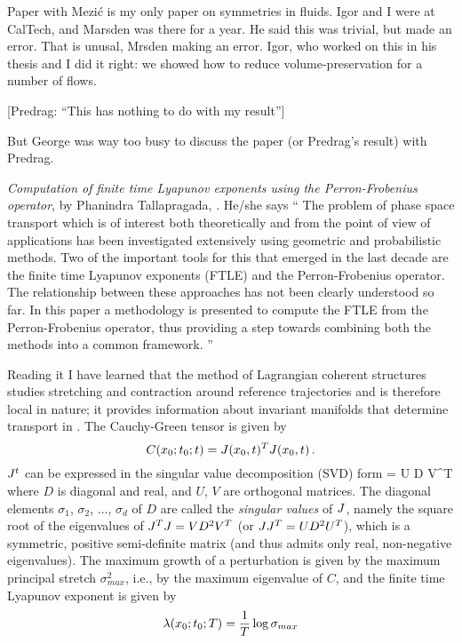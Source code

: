 \begin{description}

Paper with Mezi\'c is my only paper on symmetries in fluids.
Igor and I were at CalTech, and Marsden was there for a year. He said
this was trivial, but made an error. That is unusal, Mrsden making an
error. Igor, who worked on this in his thesis and I did it right: we
showed how to reduce volume-preservation for a number of flows.

[Predrag: ``This has nothing to do with my result'']

But George was way too busy to discuss the paper (or Predrag's result)
with Predrag.

\item[2011-07-16 Predrag]
{\em Computation of finite time {Lyapunov} exponents using the
{Perron-Frobenius} operator}, by Phanindra Tallapragada,
. He/she says
``
    The problem of phase space transport which is of interest both
    theoretically and from the point of view of applications has been
    investigated extensively using geometric and probabilistic methods.
    Two of the important tools for this that emerged in the last decade
    are the finite time Lyapunov exponents (FTLE) and the
    Perron-Frobenius operator. The relationship between these approaches
    has not been clearly understood so far. In this paper a methodology
    is presented to compute the FTLE from the Perron-Frobenius operator,
    thus providing a step towards combining both the methods into a
    common framework.
''

                                                    \toCB
Reading it I have learned that the method of Lagrangian coherent
structures studies stretching and contraction around reference
trajectories and is therefore local in nature; it provides information
about invariant manifolds that determine transport in \statesp. The
Cauchy-Green tensor is given by
\[
C({x_0}; t_0; t) = J({x_0},t)^T J({x_0},t)
\,.
\]
$J^t$ can be expressed in the singular value decomposition (SVD) form
\beq
\jMps = {U} {D}  {V}^T
where ${D}$ is diagonal and real, and ${U}$, ${V}$ are orthogonal
matrices. The diagonal elements
$\sigma_{1}$, $\sigma_{2}$, $\dots$, $\sigma_{d}$ of ${D}$ are called the
\emph{singular values} of $\jMps$, namely the square root of the
eigenvalues of $\jMps^{T}\jMps = {V}{D}^{2}{V}^T$ (or $\jMps\jMps^{T} =
{U}{D}^{2}{U}^T$), which is a symmetric, positive semi-definite matrix
(and thus admits only real, non-negative eigenvalues).
The maximum growth of a
perturbation is given by the maximum principal stretch
\(
\sigma_{max}^2
\), i.e., by the maximum eigenvalue of $C$,
and the finite time Lyapunov exponent is given by
\[
\Lyap(\xInit; t_0; T) = \frac{1}{T} \log \sigma_{max}
\]


\end{description}
